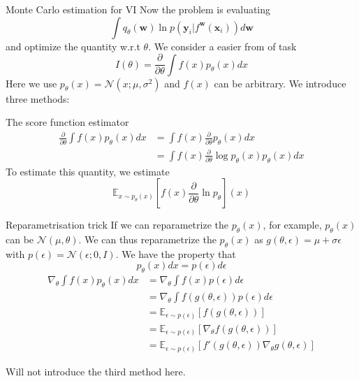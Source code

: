 \documentclass{beamer}
\begin{document}
\begin{frame}[allowframebreaks]{Monte Carlo estimation for VI}
Now the problem is evaluating $$\int q_\theta(\mathbf{w}) \ln p(\mathbf{y}_i | f^\mathbf{w} (\mathbf{x}_i)) d\mathbf{w}$$ and optimize the quantity w.r.t $\theta$.
We consider a easier from of task
$$I(\theta) = \frac{\partial}{\partial \theta} \int f(x) p_\theta(x) dx$$
Here we use $p_\theta(x) = \mathcal{N} (x; \mu, \sigma^2)$ and $f(x)$ can be arbitrary. We introduce three methods:

\framebreak

\begin{block}{The score function estimator}
\begin{align*}
\frac{\partial}{\partial \theta} \int f(x) p_\theta(x) dx & = \int f(x) \frac{\partial}{\partial \theta} p_\theta(x) dx \\
& = \int f(x) \frac{\partial}{\partial \theta} \log p_\theta (x) p_\theta (x) dx 
\end{align*}
To estimate this quantity, we estimate $$\mathbb{E}_{x \sim p_\theta(x)}[f(x) \frac{\partial}{\partial \theta} \ln p_\theta](x)$$

\end{block}

\framebreak

\begin{block}{Reparametrisation trick}
If we can reparametrize the $p_\theta(x)$, for example, $p_\theta(x)$ can be $\mathcal{N}(\mu, \theta)$. We can thus reparametrize the $p_\theta(x)$ as $g(\theta, \epsilon) = \mu + \sigma \epsilon$ with $p(\epsilon) = \mathcal{N}(\epsilon; 0, I)$. We have the property that
$$p_\theta(x) dx = p(\epsilon) d \epsilon$$
\begin{align*}
\nabla_\theta \int f(x) p_\theta(x) dx & = \nabla_\theta  \int f(x) p(\epsilon) d\epsilon \\
& = \nabla_\theta  \int f(g(\theta, \epsilon)) p(\epsilon) d\epsilon \\ 
& = \mathbb{E}_{\epsilon \sim p(\epsilon)} [f(g(\theta, \epsilon))] \\ 
& = \mathbb{E}_{\epsilon \sim p(\epsilon)} [\nabla_\theta f(g(\theta, \epsilon))] \\
& = \mathbb{E}_{\epsilon \sim p(\epsilon)} [f'(g(\theta, \epsilon)) \nabla_\theta g(\theta, \epsilon)]
\end{align*}
\end{block}

Will not introduce the third method here.
\end{frame}
\end{document}
